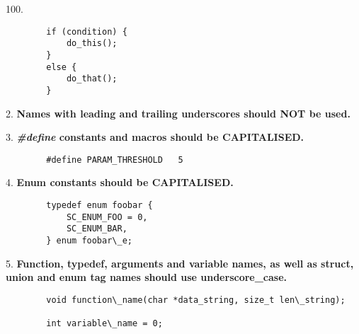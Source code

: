 \begin{labeling}{100.}
\begin{verbatim}
        if (condition) {
            do_this();
        }
        else {
            do_that();
        }
   \end{verbatim}
\item [2.] \textbf{Names with leading and trailing underscores should NOT be used.} \\
\item [3.] \textbf{\textit{\#define} constants and macros should be CAPITALISED.}
   \begin{verbatim}
        #define PARAM_THRESHOLD   5
   \end{verbatim}
\item [4.] \textbf{Enum constants should be CAPITALISED.}\\
   \begin{verbatim}
        typedef enum foobar {
            SC_ENUM_FOO = 0,
            SC_ENUM_BAR,
        } enum foobar\_e;
   \end{verbatim}
\item [5.] \textbf{Function, typedef, arguments and variable names, as well as struct, union and enum tag names should use underscore\_case.}\\
   \begin{verbatim}
        void function\_name(char *data_string, size_t len\_string);

        int variable\_name = 0;


\end{verbatim}
\end{labeling}
